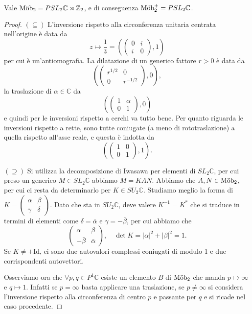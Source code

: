 \begin{teorema}
	Vale $\operatorname{M\ddot ob}_{2} = PSL_{2}\mathbb C\rtimes\mathbb Z_{2}$, e di conseguenza $\operatorname{M\ddot ob}_{2}^{+} = PSL_{2}\mathbb C$.
\end{teorema}
\begin{proof}
	$(\subseteq)$ L'inversione rispetto alla circonferenza unitaria centrata nell'origine è data da 
	$$z\mapsto \frac{1}{\bar z} = \left(\begin{pmatrix}0 & i\\ i & 0\end{pmatrix}, 1\right)$$
	per cui è un'antiomografia. 
	La dilatazione di un generico fattore $r>0$ è data da 
	$$\left(\begin{pmatrix}r^{1/2} & 0\\ 0 & r^{-1/2}\end{pmatrix}, 0\right),$$
	la traslazione di $\alpha\in\mathbb C$ da 
	$$\left(\begin{pmatrix}1 & \alpha\\ 0 & 1\end{pmatrix}, 0\right)$$
	e quindi per le inversioni rispetto a cerchi va tutto bene. 
	Per quanto riguarda le inversioni rispetto a rette, sono tutte coniugate (a meno di rototraslazione) a quella rispetto all'asse reale, e questa è indotta da 
	$$\left(\begin{pmatrix}1 & 0\\ 0 & 1\end{pmatrix}, 1\right).$$
	
	$(\supseteq)$ Si utilizza la decomposizione di Iwasawa per elementi di $SL_{2}\mathbb C$, per cui preso un generico $M\in SL_{2}\mathbb C$ abbiamo $M = KAN$. Abbiamo che $A,N\in \operatorname{M\ddot ob}_{2}$, per cui ci resta da determinarlo per $K\in SU_{2}\mathbb C$.
	Studiamo meglio la forma di $K = \begin{pmatrix}\alpha & \beta \\\gamma & \delta\end{pmatrix}$.
	Dato che sta in $SU_{2}\mathbb C$, deve valere $K^{-1} = K^{*}$ che si traduce in termini di elementi come $\delta = \bar\alpha$ e $\gamma = -\bar\beta$, per cui abbiamo che 
	$$\begin{pmatrix}\alpha & \beta \\ -\bar\beta & \bar\alpha\end{pmatrix},\quad \det K = |\alpha|^{2} + |\beta|^{2} = 1.$$
	Se $K\neq\pm \text{Id}$, ci sono due autovalori complessi coniugati di modulo 1 e due corrispondenti autovettori. 
	
	Osserviamo ora che $\forall p,q\in P^{1}\mathbb C$ esiste un elemento $B$ di $\operatorname{M\ddot ob}_{2}$ che manda $p\mapsto\infty$ e $q\mapsto1$. Infatti se $p=\infty$ basta applicare una traslazione, se $p\neq\infty$ si considera l'inversione rispetto alla circonferenza di centro $p$ e passante per $q$ e si ricade nel caso procedente.
	

\end{proof}
